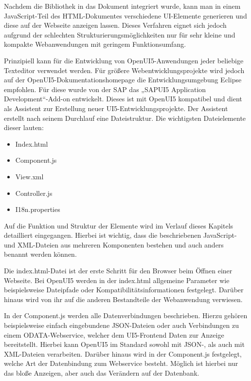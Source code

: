 Nachdem die Bibliothek in das Dokument integriert wurde, kann man in einem JavaScript-Teil des HTML-Dokumentes verschiedene UI-Elemente generieren und diese auf der Webseite anzeigen lassen. Dieses Verfahren eignet sich jedoch aufgrund der schlechten Strukturierungsmöglichkeiten nur für sehr kleine und kompakte Webanwendungen mit geringem Funktionsumfang. 

Prinzipiell kann für die Entwicklung von OpenUI5-Anwendungen jeder beliebige Texteditor verwendet werden. Für größere Webentwicklungsprojekte wird jedoch auf der OpenUI5-Dokumentationshomepage die Entwicklungsumgebung Eclipse empfohlen. Für diese wurde von der SAP das „SAPUI5 Application Development“-Add-on entwickelt. Dieses ist mit OpenUI5 kompatibel und dient als Assistent zur Erstellung neuer UI5-Entwicklungsprojekte. Der Assistent erstellt nach seinem Durchlauf eine Dateistruktur. Die wichtigsten Dateielemente dieser lauten:

\begin{itemize}
	\item Index.html
	\item Component.js
	\item View.xml
	\item Controller.js
	\item I18n.properties
\end{itemize}

Auf die Funktion und Struktur der Elemente wird im Verlauf dieses Kapitels detailliert eingegangen. Hierbei ist wichtig, dass die beschriebenen JavaScript- und XML-Dateien aus mehreren Komponenten bestehen und auch anders benannt werden können. 

Die index.html-Datei ist der erste Schritt für den Browser beim Öffnen einer Webseite. Bei OpenUI5 werden in der index.html allgemeine Parameter wie beispielsweise Dateipfade oder Kompatibilitätsinformationen festgelegt. Darüber hinaus wird von ihr auf die anderen Bestandteile der Webanwendung verwiesen.

In der Component.js werden alle Datenverbindungen beschrieben. Hierzu gehören beispielsweise einfach eingebundene JSON-Dateien oder auch Verbindungen zu einem ODATA-Webservice, welcher dem UI5-Frontend Daten zur Anzeige bereitstellt. Hierbei kann OpenUI5 im Standard sowohl mit JSON-, als auch mit XML-Dateien verarbeiten. Darüber hinaus wird in der Component.js festgelegt, welche Art der Datenbindung zum Webservice besteht. Möglich ist hierbei nur das bloße Anzeigen, aber auch das Verändern auf der Datenbank.

